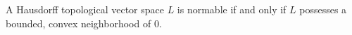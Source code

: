 A Hausdorff topological vector space $L$ is normable if and only if $L$ possesses a bounded, convex neighborhood of $0$.
